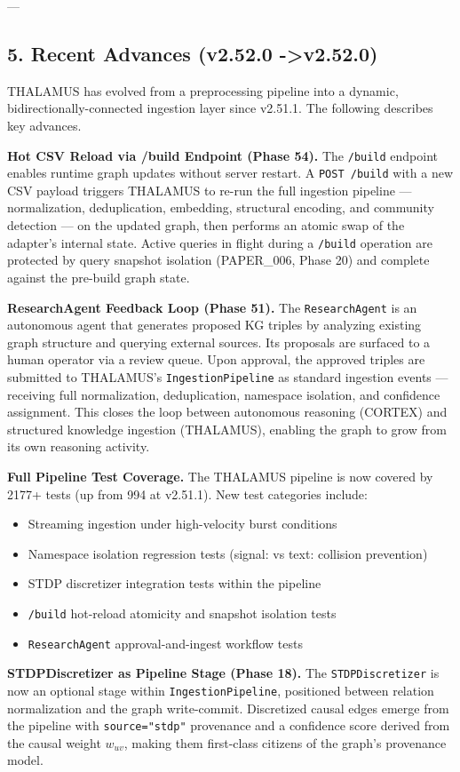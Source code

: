 ---

\subsection{5. Recent Advances (v2.52.0 -\textgreater  v2.52.0)}

THALAMUS has evolved from a prepr\-ocessing pipeline into a dynamic, bidir\-ectionally-connected ingestion layer since v2.51.1. The following describes key advances.

\textbf{Hot CSV Reload via /build Endpoint (Phase 54).} The \texttt{/build} endpoint enables runtime graph updates without server restart. A \texttt{POST /build} with a new CSV payload triggers THALAMUS to re-run the full ingestion pipeline — norma\-lization, dedup\-lication, embedding, structural encoding, and community detection — on the updated graph, then performs an atomic swap of the adapter's internal state. Active queries in flight during a \texttt{/build} operation are protected by query snapshot isolation (PAPER\_006, Phase 20) and complete against the pre-build graph state.

\textbf{ResearchAgent Feedback Loop (Phase 51).} The \texttt{ResearchAgent} is an autonomous agent that generates proposed KG triples by analyzing existing graph structure and querying external sources. Its proposals are surfaced to a human operator via a review queue. Upon approval, the approved triples are submitted to THALAMUS's \texttt{IngestionPipeline} as standard ingestion events — receiving full norma\-lization, dedup\-lication, namespace isolation, and confidence assignment. This closes the loop between autonomous reasoning (CORTEX) and structured knowledge ingestion (THALAMUS), enabling the graph to grow from its own reasoning activity.

\textbf{Full Pipeline Test Coverage.} The THALAMUS pipeline is now covered by 2177+ tests (up from 994 at v2.51.1). New test categories include:
\begin{itemize}
\item Streaming ingestion under high-velocity burst conditions
\item Namespace isolation regression tests (signal: vs text: collision prevention)
\item STDP discretizer integration tests within the pipeline
\item \texttt{/build} hot-reload atomicity and snapshot isolation tests
\item \texttt{ResearchAgent} approval-and-ingest workflow tests

\end{itemize}
\textbf{STDPDiscre\-tizer as Pipeline Stage (Phase 18).} The \texttt{STDPDiscretizer} is now an optional stage within \texttt{IngestionPipeline}, positioned between relation norma\-lization and the graph write-commit. Discretized causal edges emerge from the pipeline with \texttt{source="stdp"} provenance and a confidence score derived from the causal weight $w_{uv}$, making them first-class citizens of the graph's provenance model.

